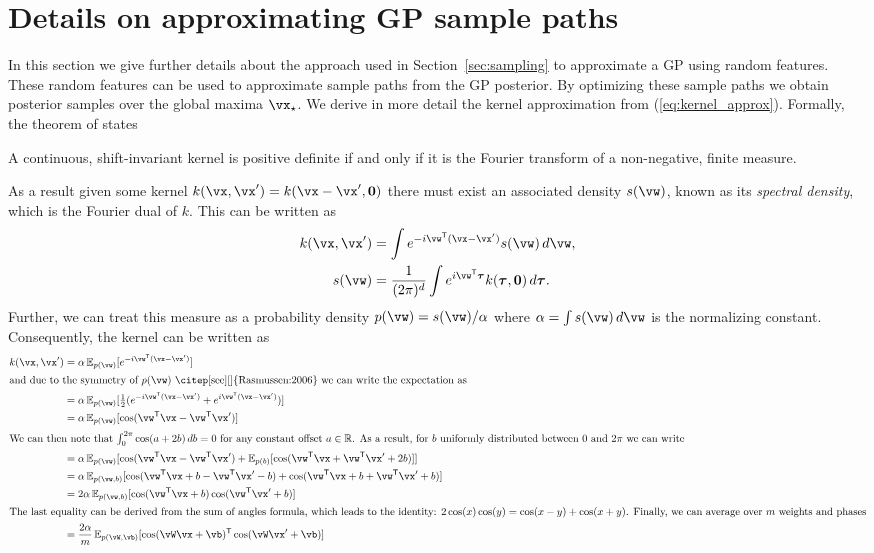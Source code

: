 \section{Details on approximating GP sample paths}
\label{sec:samplingAppendix}

In this section we give further details about the approach used in
Section~\ref{sec:sampling} to approximate a GP using random features. 
These random features can be used to approximate sample paths from the GP
posterior. By optimizing these sample paths we obtain
posterior samples over the global maxima $\xopt$.  We derive in more
detail the kernel approximation from (\ref{eq:kernel_approx}). Formally, the
theorem of \citep{Bochner:1959} states
\begin{theorem}
    A continuous, shift-invariant kernel is positive definite if and only if it
    is the Fourier transform of a non-negative, finite measure.
\end{theorem}
\noindent As a result given some kernel $k(\x,\x')=k(\x-\x',\zero)$ there must
exist an associated density $s(\vw)$, known as its \emph{spectral density},
which is the Fourier dual of $k$. This can be written as
\begin{align*}
    k(\vx,\vx')
    &= \int e^{-i\vw\T(\vx-\vx')} s(\vw)\,d\vw,
    \\
    s(\vw)
    &= \frac1{(2\pi)^d} \int e^{i\vw\T\vtau} k(\vtau,\zero) \,d\vtau.
\end{align*}
Further, we can treat this measure as a probability density
$p(\vw)=s(\vw)/\alpha$ where $\alpha=\int s(\vw)\,d\vw$ is the normalizing
constant. Consequently, the kernel can be written as
\begin{align*}
    k(\vx,\vx')
    &= \alpha \,\E_{p(\vw)}[e^{-i\vw\T(\vx-\vx')}]
    \\
    \intertext{and due to the symmetry of $p(\vw)$ \citep[see][]{Rasmussen:2006}
    we can write the expectation as}
    &= \alpha \,\E_{p(\vw)}[\tfrac12 (e^{-i\vw\T(\vx-\vx')} + e^{i\vw\T(\vx-\vx')}) ]
    \\
    &= \alpha \,\E_{p(\vw)}[\cos(\vw\T\vx-\vw\T\vx')]
    \\
    \intertext{We can then note that $\int_0^{2\pi}\cos(a+2b)\,db=0$ for any
    constant offset $a\in\R$. As a result, for $b$ uniformly distributed between
    0 and $2\pi$ we can write}
    &= \alpha \,\E_{p(\vw)}[\cos(\vw\T\vx-\vw\T\vx') +
                \E_{p(  b)}[\cos(\vw\T\vx+\vw\T\vx'+2b)]]
    \\
    &= \alpha \,\E_{p(\vw,b)}[\cos(\vw\T\vx+b - \vw\T\vx' - b) +
                              \cos(\vw\T\vx+b + \vw\T\vx' + b)]
    \\
    &= 2\alpha \,\E_{p(\vw,b)}[\cos(\vw\T\vx+b)\cos(\vw\T\vx' + b)]
    \\
    \intertext{The last equality can be derived from the sum of angles formula,
    which leads to the identity: $2\cos(x)\cos(y)=\cos(x-y)+\cos(x+y)$. Finally,
    we can average over $m$ weights and phases}
    &=
    \frac{2\alpha}{m} 
    \,\E_{p(\vW,\vb)}[\cos(\vW\vx+\vb)\T\cos(\vW\vx' + \vb)]
\end{align*}

